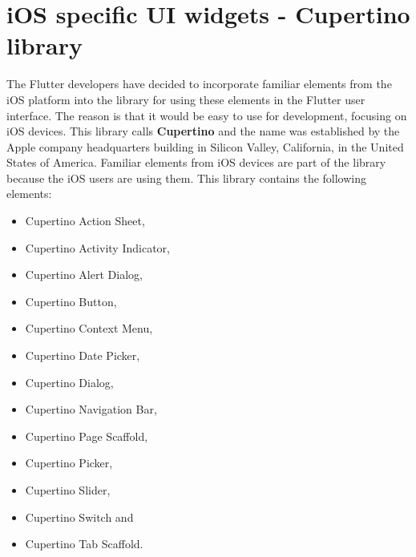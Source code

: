 \section{iOS specific UI widgets - Cupertino library}\label{sec:ios-specific-ui-widgets}
The Flutter developers have decided to incorporate familiar elements from the iOS platform into the library for using these elements in the Flutter user interface.
The reason is that it would be easy to use for development, focusing on iOS devices.
This library calls \textbf{Cupertino} and the name was established by the Apple company headquarters building in Silicon Valley, California, in the United States of America.
Familiar elements from iOS devices are part of the library because the iOS users are using them.
This library contains the following elements:
\begin{itemize}
    \item Cupertino Action Sheet,
    \item Cupertino Activity Indicator,
    \item Cupertino Alert Dialog,
    \item Cupertino Button,
    \item Cupertino Context Menu,
    \item Cupertino Date Picker,
    \item Cupertino Dialog,
    \item Cupertino Navigation Bar,
    \item Cupertino Page Scaffold,
    \item Cupertino Picker,
    \item Cupertino Slider,
    \item Cupertino Switch and
    \item Cupertino Tab Scaffold.\cite{cupertino}
\end{itemize}
